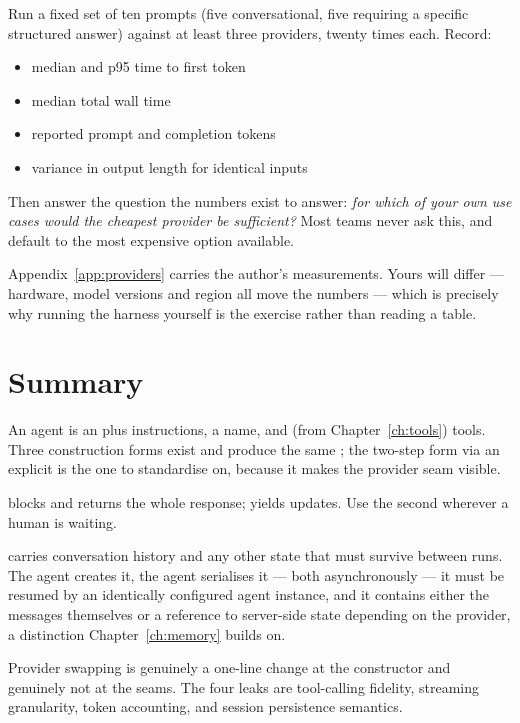\begin{exercisebox}
Run a fixed set of ten prompts (five conversational, five requiring a specific
structured answer) against at least three providers, twenty times each. Record:

\begin{itemize}[leftmargin=1.4em]
\item median and p95 time to first token
\item median total wall time
\item reported prompt and completion tokens
\item variance in output length for identical inputs
\end{itemize}

Then answer the question the numbers exist to answer: \emph{for which of your own
use cases would the cheapest provider be sufficient?} Most teams never ask this,
and default to the most expensive option available.
\end{exercisebox}

Appendix~\ref{app:providers} carries the author's measurements. Yours will differ
--- hardware, model versions and region all move the numbers --- which is
precisely why running the harness yourself is the exercise rather than reading a
table.

\section{Summary}

An agent is an  plus instructions, a name, and (from
Chapter~\ref{ch:tools}) tools. Three construction forms exist and produce the same
; the two-step form via an explicit  is the
one to standardise on, because it makes the provider seam visible.

 blocks and returns the whole response; 
yields updates. Use the second wherever a human is waiting.

 carries conversation history and any other state that must
survive between runs. The agent creates it, the agent serialises it --- both
asynchronously --- it must be resumed by an identically configured agent
instance, and it contains either the messages themselves or a reference to
server-side state depending on the provider, a distinction
Chapter~\ref{ch:memory} builds on.

Provider swapping is genuinely a one-line change at the constructor and genuinely
not at the seams. The four leaks are tool-calling fidelity, streaming
granularity, token accounting, and session persistence semantics.

